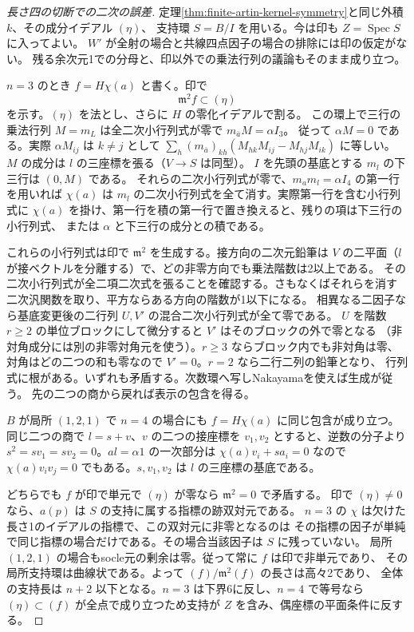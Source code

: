 \begin{proof}[長さ四の切断での二次の誤差]
定理\ref{thm:finite-artin-kernel-symmetry}と同じ外積 $k$、その成分イデアル $(\eta)$、
支持環 $S=B/I$ を用いる。今は印も $Z=\operatorname{Spec}S$ に入ってよい。
$W'$ が全射の場合と共線四点因子の場合の排除には印の仮定がない。
残る余次元1での分母と、印以外での乗法行列の議論もそのまま成り立つ。

$n=3$ のとき $f=H\chi(a)$ と書く。印で
\[
                          \mathfrak m^2 f\subset(\eta)
\]
を示す。$(\eta)$ を法とし、さらに $H$ の零化イデアルで割る。
この環上で三行の乗法行列 $M=m_L$ は全二次小行列式が零で $m_{\bar a}M=\alpha I_3$。
従って $\alpha M=0$ である。実際 $\alpha M_{ij}$ は $k\ne j$ として
$\sum_h(m_{\bar a})_{kh}(M_{hk}M_{ij}-M_{hj}M_{ik})$ に等しい。
$M$ の成分は $l$ の三座標を張る（$V\to S$ は同型）。
$I$ を先頭の基底とする $m_l$ の下三行は $(0,M)$ である。
それらの二次小行列式が零で、$m_a m_l=\alpha I_4$ の第一行を用いれば
$\chi(a)$ は $m_l$ の二次小行列式を全て消す。実際第一行を含む小行列式に
$\chi(a)$ を掛け、第一行を積の第一行で置き換えると、残りの項は下三行の小行列式、
または $\alpha$ と下三行の成分との積である。

これらの小行列式は印で $\mathfrak m^2$ を生成する。接方向の二次元鉛筆は
$V$ の二平面（$l$ が接ベクトルを分離する）で、どの非零方向でも乗法階数は2以上である。
その二次小行列式が全二項二次式を張ることを確認する。さもなくばそれらを消す
二次汎関数を取り、平方ならある方向の階数が1以下になる。
相異なる二因子なら基底変更後の二行列 $U,V'$ の混合二次小行列式が全て零である。
$U$ を階数 $r\ge2$ の単位ブロックにして微分すると $V'$ はそのブロックの外で零となる
（非対角成分には別の非零対角元を使う）。$r\ge3$ ならブロック内でも非対角は零、
対角はどの二つの和も零なので $V'=0$。$r=2$ なら二行二列の鉛筆となり、
行列式に根がある。いずれも矛盾する。次数環へ写しNakayamaを使えば生成が従う。
先の二つの商から戻れば表示の包含を得る。

$B$ が局所 $(1,2,1)$ で $n=4$ の場合にも $f=H\chi(a)$ に同じ包含が成り立つ。
同じ二つの商で $l=s+v$、$v$ の二つの接座標を $v_1,v_2$ とすると、逆数の分子より
$s^2=s v_1=s v_2=0$。$al=\alpha 1$ の一次部分は $\chi(a)v_i+s a_i=0$ なので
$\chi(a)v_i v_j=0$ でもある。$s,v_1,v_2$ は $l$ の三座標の基底である。

どちらでも $f$ が印で単元で $(\eta)$ が零なら $\mathfrak m^2=0$ で矛盾する。
印で $(\eta)\ne0$ なら、$a(p)$ は $S$ の支持に属する指標の跡双対元である。
$n=3$ の $\chi$ は欠けた長さ1のイデアルの指標で、この双対元に非零となるのは
その指標の因子が単純で同じ指標の場合だけである。その場合当該因子は $S$ に残っていない。
局所 $(1,2,1)$ の場合もsocle元の剰余は零。従って常に $f$ は印で非単元であり、
その局所支持環は曲線状である。よって $(f)/\mathfrak m^2(f)$ の長さは高々2であり、
全体の支持長は $n+2$ 以下となる。$n=3$ は下界6に反し、$n=4$ で等号なら
$(\eta)\subset(f)$ が全点で成り立つため支持が $Z$ を含み、偶座標の平面条件に反する。
\end{proof}

